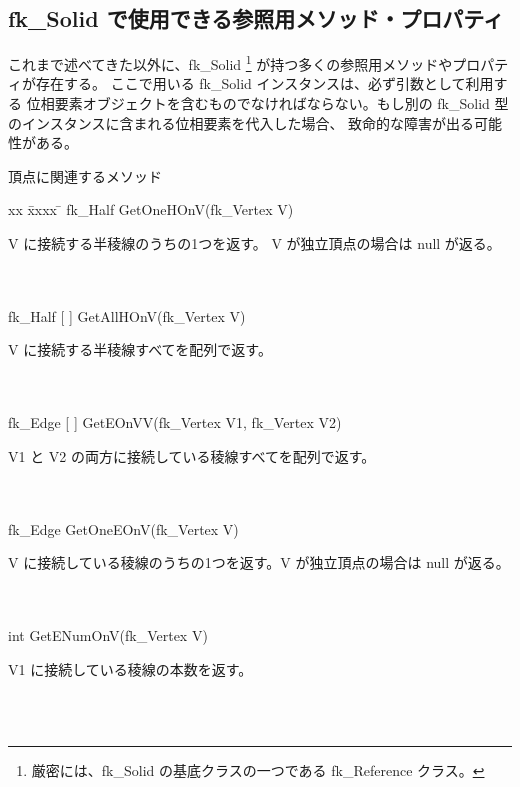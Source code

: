 \subsection{fk\_Solid で使用できる参照用メソッド・プロパティ}
これまで述べてきた以外に、fk\_Solid \footnote{厳密には、fk\_Solid の基底クラスの一つである
fk\_Reference クラス。} が持つ多くの参照用メソッドやプロパティが存在する。
ここで用いる fk\_Solid インスタンスは、必ず引数として利用する
位相要素オブジェクトを含むものでなければならない。もし別の
fk\_Solid 型のインスタンスに含まれる位相要素を代入した場合、
致命的な障害が出る可能性がある。
\begin{center}
{\large 頂点に関連するメソッド}
\end{center}
\begin{tabbing}
xx \= xxxx \= \kill
\> fk\_Half GetOneHOnV(fk\_Vertex V) \\
	\> \> \begin{minipage}[]{15cm}
		V に接続する半稜線のうちの1つを返す。
		V が独立頂点の場合は null が返る。
	\end{minipage} \\ \\

\> fk\_Half [ ] GetAllHOnV(fk\_Vertex V) \\
	\> \> \begin{minipage}[]{15cm}
		V に接続する半稜線すべてを配列で返す。
	\end{minipage} \\ \\

\> fk\_Edge [ ] GetEOnVV(fk\_Vertex V1, fk\_Vertex V2) \\
	\> \> \begin{minipage}[]{15cm}
		V1 と V2 の両方に接続している稜線すべてを配列で返す。		
	\end{minipage} \\ \\

\> fk\_Edge GetOneEOnV(fk\_Vertex V) \\
	\> \> \begin{minipage}[]{15cm}
		V に接続している稜線のうちの1つを返す。V が独立頂点の場合は null が返る。
	\end{minipage} \\ \\

\> int GetENumOnV(fk\_Vertex V) \\
	\> \> \begin{minipage}[]{15cm}
		V1 に接続している稜線の本数を返す。
	\end{minipage} \\ \\


\end{tabbing}
